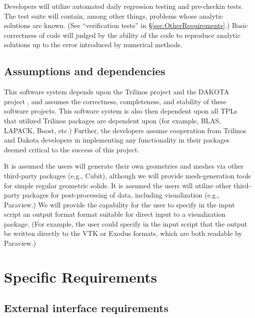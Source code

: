 \documentclass[10pt]{article}
\newcommand{\comment}[1]{} %
\theoremstyle{plain}
\theoremstyle{definition}
\newcommand{\MLP}[1]{\textcolor{MyDarkBlue}{[#1]}}
\begin{document}
Developers will utilize automated daily regression testing and pre-checkin tests.  The test suite will contain, among other things, problems whose analytic solutions are known. (See ``verification tests'' in \S\ref{sec:OtherRequirements}.) Basic correctness of code will judged by the ability of the code to reproduce analytic solutions up to the error introduced by numerical methods.

\comment{
\MLP{Dave: Can you say more about acceptance tests? What's done for Sierra mechanics? Mostly comparison of numerical solution to analytic solution (for cases where analytic solution is know)? Does it make sense for us to use any tests from Sierra?}
}

\subsection{Assumptions and dependencies}

This software system depends upon the Trilinos project \cite{Heroux:2005:Trilinos} and the DAKOTA project \cite{Eldred:2008:Dakota}, and assumes the correctness, completeness, and stability of these software projects. This software system is also then dependent upon all TPLs that utilized Trilinos packages are dependent upon (for example, BLAS, LAPACK, Boost, etc.) Further, the developers assume cooperation from Trilinos and Dakota developers in implementing any functionality in their packages deemed critical to the success of this project.

It is assumed the users will generate their own geometries and meshes via other third-party packages (e.g., Cubit), although we will provide mesh-generation tools for simple regular geometric solids. It is assumed the users will utilize other third-party packages for post-processing of data, including visualization (e.g., Paraview.) We will provide the capability for the user to specify in the input script an output format format suitable for direct input to a visualization package. (For example, the user could specify in the input script that the output be written directly to the VTK or Exodus formats, which are both readable by Paraview.)

\section{Specific Requirements} \label{sec:Requirements}

\subsection{External interface requirements}
\end{document}

